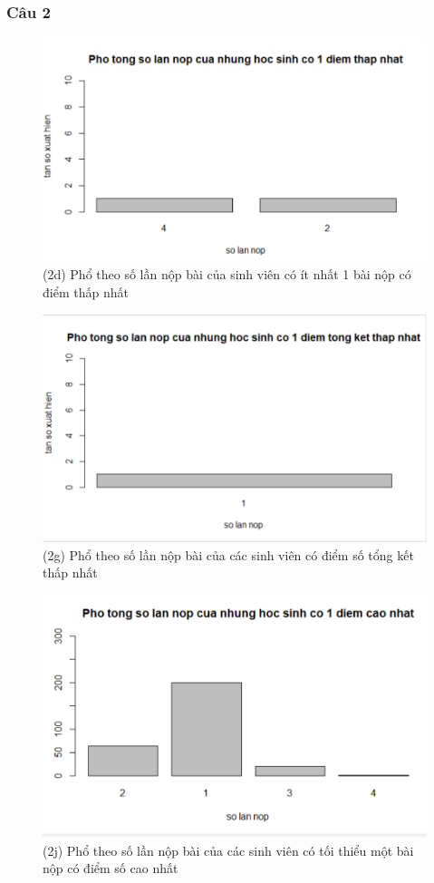 \documentclass[a4paper]{article}
\theoremstyle{definition}
\begin{document}
\subsubsection{Câu 2}
\begin{figure}[!ht]
    \centering
    \includegraphics[scale=0.4]{Pics/q2d-file1.PNG}
    \caption{(2d) Phổ theo số lần nộp bài của sinh viên có ít nhất 1 bài nộp có điểm thấp nhất}
    \label{fig:my_label}
\end{figure}
\begin{figure}[!ht]
    \centering
    \includegraphics[scale=0.4]{Pics/q2g-file1.PNG}
    \caption{(2g) Phổ theo số lần nộp bài của các sinh viên có điểm số tổng kết thấp nhất }
    \label{fig:my_label}
\end{figure}
\newpage
\begin{figure}[!ht]
    \centering
    \includegraphics[scale=0.4]{Pics/q2j-file1.PNG}
    \caption{(2j)  Phổ theo số lần nộp bài của các sinh viên có tối thiểu một bài nộp có điểm số cao nhất}
    \label{fig:my_label}
\end{figure}
\end{document}
